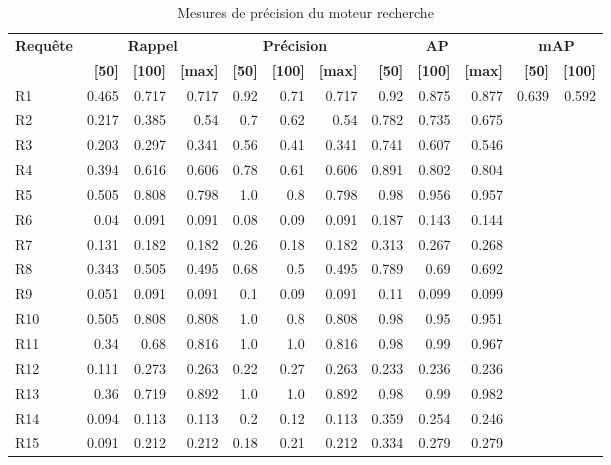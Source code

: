 \begin{table}[H]
\centering
\begin{tabular}{l|rrr|rrr|rrr|rr}
\toprule
\textbf{Requête} & \multicolumn{3}{c}{\textbf{Rappel}} & \multicolumn{3}{c}{\textbf{Précision}} & \multicolumn{3}{c}{\textbf{AP}} & \multicolumn{2}{c}{\textbf{mAP}} \\
 & \textbf{[50]} & \textbf{[100]} & \textbf{[max]} & \textbf{[50]} & \textbf{[100]} & \textbf{[max]} & \textbf{[50]} & \textbf{[100]} & \textbf{[max]} & \textbf{[50]} & \textbf{[100]} \\
\midrule
R1 & 0.465 & 0.717 & 0.717 & 0.92 & 0.71 & 0.717 & 0.92 & 0.875 & 0.877 & \multirow{15}{*}{0.639} & \multirow{15}{*}{0.592} \\
R2 & 0.217 & 0.385 & 0.54 & 0.7 & 0.62 & 0.54 & 0.782 & 0.735 & 0.675 \\
R3 & 0.203 & 0.297 & 0.341 & 0.56 & 0.41 & 0.341 & 0.741 & 0.607 & 0.546 \\
R4 & 0.394 & 0.616 & 0.606 & 0.78 & 0.61 & 0.606 & 0.891 & 0.802 & 0.804 \\
R5 & 0.505 & 0.808 & 0.798 & 1.0 & 0.8 & 0.798 & 0.98 & 0.956 & 0.957 \\
R6 & 0.04 & 0.091 & 0.091 & 0.08 & 0.09 & 0.091 & 0.187 & 0.143 & 0.144 \\
R7 & 0.131 & 0.182 & 0.182 & 0.26 & 0.18 & 0.182 & 0.313 & 0.267 & 0.268 \\
R8 & 0.343 & 0.505 & 0.495 & 0.68 & 0.5 & 0.495 & 0.789 & 0.69 & 0.692 \\
R9 & 0.051 & 0.091 & 0.091 & 0.1 & 0.09 & 0.091 & 0.11 & 0.099 & 0.099 \\
R10 & 0.505 & 0.808 & 0.808 & 1.0 & 0.8 & 0.808 & 0.98 & 0.95 & 0.951 \\
R11 & 0.34 & 0.68 & 0.816 & 1.0 & 1.0 & 0.816 & 0.98 & 0.99 & 0.967 \\
R12 & 0.111 & 0.273 & 0.263 & 0.22 & 0.27 & 0.263 & 0.233 & 0.236 & 0.236 \\
R13 & 0.36 & 0.719 & 0.892 & 1.0 & 1.0 & 0.892 & 0.98 & 0.99 & 0.982 \\
R14 & 0.094 & 0.113 & 0.113 & 0.2 & 0.12 & 0.113 & 0.359 & 0.254 & 0.246 \\
R15 & 0.091 & 0.212 & 0.212 & 0.18 & 0.21 & 0.212 & 0.334 & 0.279 & 0.279 \\
\bottomrule
\end{tabular}
\caption{Mesures de précision du moteur recherche}
\label{tab:results}
\end{table}

